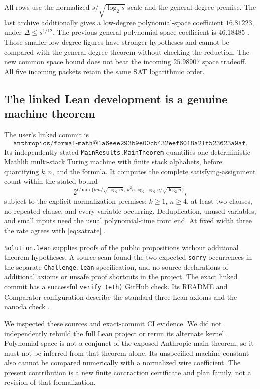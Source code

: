 All rows use the normalized \(s/\sqrt{\log_2 s}\) scale and the general
degree premise. The last archive additionally gives a low-degree
polynomial-space coefficient \(16.81223\), under
\(\Delta\le s^{1/12}\). The previous general polynomial-space coefficient
is \(46.18485\) \cite{flags,pairwise,incoming}.
Those smaller low-degree figures have stronger hypotheses and cannot be
compared with the general-degree theorem without checking the reduction.
The new common space bound does not beat the incoming \(25.98907\) space
tradeoff. All five incoming packets retain the same SAT logarithmic order.

\subsection{The linked Lean development is a genuine machine theorem}

The user's linked commit is
\[
 \texttt{anthropics/formal-math@1a6eee293b9e00cb432eef6018a21f523623a9af}.
\]
Its independently stated \texttt{MainResults.MainTheorem} quantifies one
deterministic Mathlib multi-stack Turing machine with finite stack
alphabets, before quantifying \(k,n\), and the formula. It computes the
complete satisfying-assignment count within the stated bound
\[
 2^{C\min\{km/\sqrt{\log_2m},
              \ k^2n\log_2\log_2n/\sqrt{\log_2n}\}},
\]
subject to the explicit normalization premises: \(k\ge1\), \(n\ge4\),
at least two clauses, no repeated clause, and every variable occurring.
Deduplication, unused variables, and small inputs need the usual
polynomial-time front end. At fixed width three the rate agrees with
\eqref{eq:satrate} \cite{anthropic-main,anthropic-solution}.

\texttt{Solution.lean} supplies proofs of the public propositions without
additional theorem hypotheses. A source scan found the two expected
\texttt{sorry} occurrences in the separate \texttt{Challenge.lean}
specification, and no source declarations of additional axioms or
unsafe proof shortcuts in the project. The exact linked commit has a
successful \texttt{verify (eth)} GitHub check. Its README and Comparator
configuration describe the standard three Lean axioms and the nanoda check
\cite{anthropic-solution,anthropic-ci}.

We inspected these sources and exact-commit CI evidence. We did not
independently rebuild the full Lean project or rerun its alternate kernel.
Polynomial space is not a conjunct of the exposed Anthropic main theorem,
so it must not be inferred from that theorem alone. Its unspecified
machine constant also cannot be compared numerically with a normalized
wire coefficient. The present contribution is a new finite contraction
certificate and plan family, not a revision of that formalization.

